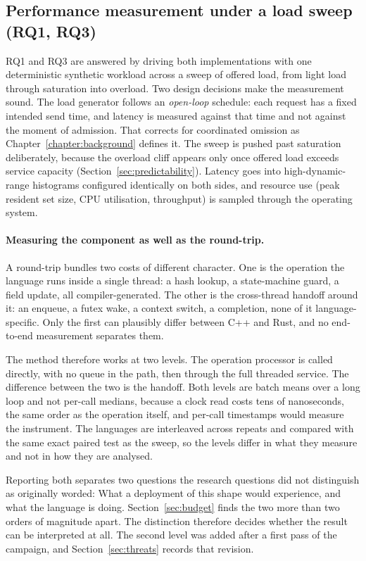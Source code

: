 \documentclass[english,oneside,a4paper,censored,csm,software-track-2020]{HYthesisML}
\begin{document}
\subsection{Performance measurement under a load sweep (RQ1, RQ3)}\label{sec:methodperf}
RQ1 and RQ3 are answered by driving both implementations with one deterministic synthetic
workload across a sweep of offered load, from light load through saturation into overload. Two
design decisions make the measurement sound. The load generator follows an \emph{open-loop}
schedule: each request has a fixed intended send time, and latency is measured against that time
and not against the moment of admission. That corrects for coordinated omission as
Chapter~\ref{chapter:background} defines it. The sweep is pushed past saturation deliberately,
because the overload cliff appears only once offered load exceeds service capacity
(Section~\ref{sec:predictability}). Latency goes into high-dynamic-range histograms configured
identically on both sides, and resource use (peak resident set size, CPU utilisation,
throughput) is sampled through the operating system.

\paragraph{Measuring the component as well as the round-trip.}
A round-trip bundles two costs of different character. One is the operation the language runs
inside a single thread: a hash lookup, a state-machine guard, a field update, all
compiler-generated. The other is the cross-thread handoff around it: an enqueue, a futex wake, a
context switch, a completion, none of it language-specific. Only the first can plausibly differ
between C++ and Rust, and no end-to-end measurement separates them.

The method therefore works at two levels. The operation processor is called directly, with no
queue in the path, then through the full threaded service. The difference between the two is the
handoff. Both levels are batch means over a long loop and not per-call medians, because a clock
read costs tens of nanoseconds, the same order as the operation itself, and per-call timestamps
would measure the instrument. The languages are interleaved across repeats and compared with the
same exact paired test as the sweep, so the levels differ in what they measure and not in how
they are analysed.

Reporting both separates two questions the research questions did not distinguish as originally
worded: What a deployment of this shape would experience, and what the language is doing.
Section~\ref{sec:budget} finds the two more than two orders of magnitude apart. The distinction
therefore decides whether the result can be interpreted at all. The second level was added after
a first pass of the campaign, and Section~\ref{sec:threats} records that revision.
\end{document}
